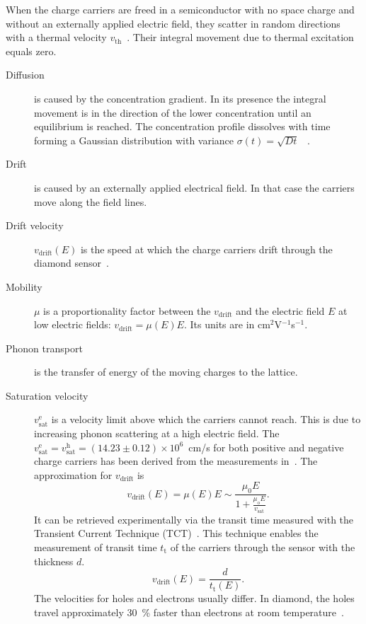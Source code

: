 When the charge carriers are freed in a semiconductor with no space charge and without an externally applied electric field, they scatter in random directions with a thermal velocity $v_{\mathrm{th}}$~\cite{PHSEM:00000}. Their integral movement due to thermal excitation equals zero. 

\begin{description}

\item[Diffusion] is caused by the concentration gradient. In its presence the integral movement is in the direction of the lower concentration until an equilibrium is reached.
The concentration profile dissolves with time forming a Gaussian distribution with variance $\sigma(t)=\sqrt{Dt}$~\cite{PHSEM:00000} .

\item[Drift] is caused by an externally applied electrical field. In that case the carriers move along the field lines. %

\item[Drift velocity] $v_\mathrm{drift}(E)$ is the speed at which the charge carriers drift through the diamond sensor~\cite{PHSEM:00000}.

\item[Mobility] $\mu$ is a proportionality factor between the $v_\mathrm{drift}$ and the electric field $E$ at low electric fields: $v_\mathrm{drift} = \mu(E) E$. Its units are in cm$^2$V$^{-1}$s$^{-1}$.

\item[Phonon transport] is the transfer of energy of the moving charges to the lattice.

\item[Saturation velocity] $v^\mathrm{e}_\mathrm{sat}$ is a velocity limit above which the carriers cannot reach. This is due to increasing phonon scattering at a high electric field. The $v^\mathrm{e}_\mathrm{sat}=v^\mathrm{h}_\mathrm{sat}=(14.23\pm0.12)\times10^6$~cm/s for both positive and negative charge carriers has been derived from the measurements in~\cite{JANSEN:00001}. The approximation for $v_\mathrm{drift}$ is~\cite{VDRIFT:00000}
\begin{equation}
\label{eq:vsat}
v_\mathrm{drift}(E) = \mu(E)E \sim \frac{\mu_\mathrm{0} E}{1 + \frac{\mu_\mathrm{o} E}{v_\mathrm{sat}}}.
\end{equation}
It can be retrieved experimentally via the transit time measured with the Transient Current Technique (TCT)~\cite{PERNEG:00001}. This technique enables the measurement of transit time $t_\mathrm{t}$ of the carriers through the sensor with the thickness $d$. 
\begin{equation}
\label{eq:vsat}
v_\mathrm{drift}(E) = \frac{d}{t_\mathrm{t}(E)}.
\end{equation}
The velocities for holes and electrons usually differ. In diamond, the holes travel approximately 30~\% faster than electrons at room temperature~\cite{Jansen:1956431}.


\end{description}


